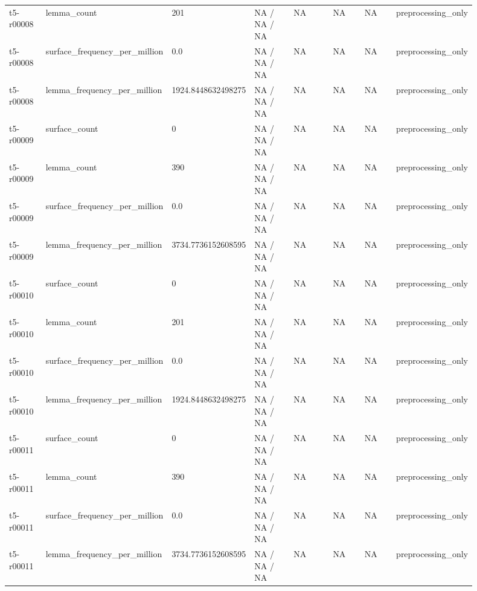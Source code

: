 \begin{longtable}{@{}p{0.09\linewidth}p{0.14\linewidth}p{0.08\linewidth}p{0.14\linewidth}p{0.14\linewidth}p{0.1\linewidth}p{0.1\linewidth}p{0.11\linewidth}@{}}
t5-r00008 & lemma\_\allowbreak{}count & 201 & NA / NA / NA & NA & NA & NA & preprocessing\_\allowbreak{}only \\
t5-r00008 & surface\_\allowbreak{}frequency\_\allowbreak{}per\_\allowbreak{}million & 0.0 & NA / NA / NA & NA & NA & NA & preprocessing\_\allowbreak{}only \\
t5-r00008 & lemma\_\allowbreak{}frequency\_\allowbreak{}per\_\allowbreak{}million & 1924.8448632498275 & NA / NA / NA & NA & NA & NA & preprocessing\_\allowbreak{}only \\
t5-r00009 & surface\_\allowbreak{}count & 0 & NA / NA / NA & NA & NA & NA & preprocessing\_\allowbreak{}only \\
t5-r00009 & lemma\_\allowbreak{}count & 390 & NA / NA / NA & NA & NA & NA & preprocessing\_\allowbreak{}only \\
t5-r00009 & surface\_\allowbreak{}frequency\_\allowbreak{}per\_\allowbreak{}million & 0.0 & NA / NA / NA & NA & NA & NA & preprocessing\_\allowbreak{}only \\
t5-r00009 & lemma\_\allowbreak{}frequency\_\allowbreak{}per\_\allowbreak{}million & 3734.7736152608595 & NA / NA / NA & NA & NA & NA & preprocessing\_\allowbreak{}only \\
t5-r00010 & surface\_\allowbreak{}count & 0 & NA / NA / NA & NA & NA & NA & preprocessing\_\allowbreak{}only \\
t5-r00010 & lemma\_\allowbreak{}count & 201 & NA / NA / NA & NA & NA & NA & preprocessing\_\allowbreak{}only \\
t5-r00010 & surface\_\allowbreak{}frequency\_\allowbreak{}per\_\allowbreak{}million & 0.0 & NA / NA / NA & NA & NA & NA & preprocessing\_\allowbreak{}only \\
t5-r00010 & lemma\_\allowbreak{}frequency\_\allowbreak{}per\_\allowbreak{}million & 1924.8448632498275 & NA / NA / NA & NA & NA & NA & preprocessing\_\allowbreak{}only \\
t5-r00011 & surface\_\allowbreak{}count & 0 & NA / NA / NA & NA & NA & NA & preprocessing\_\allowbreak{}only \\
t5-r00011 & lemma\_\allowbreak{}count & 390 & NA / NA / NA & NA & NA & NA & preprocessing\_\allowbreak{}only \\
t5-r00011 & surface\_\allowbreak{}frequency\_\allowbreak{}per\_\allowbreak{}million & 0.0 & NA / NA / NA & NA & NA & NA & preprocessing\_\allowbreak{}only \\
t5-r00011 & lemma\_\allowbreak{}frequency\_\allowbreak{}per\_\allowbreak{}million & 3734.7736152608595 & NA / NA / NA & NA & NA & NA & preprocessing\_\allowbreak{}only \\

\end{longtable}
